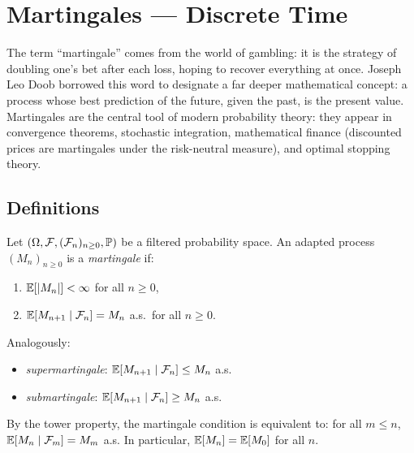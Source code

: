 \chapter{Martingales --- Discrete Time}
\label{ch:discrete_martingales}

The term ``martingale'' comes from the world of gambling: it is the strategy of doubling one's bet after each loss, hoping to recover everything at once. Joseph Leo Doob borrowed this word to designate a far deeper mathematical concept: a process whose best prediction of the future, given the past, is the present value. Martingales are the central tool of modern probability theory: they appear in convergence theorems, stochastic integration, mathematical finance (discounted prices are martingales under the risk-neutral measure), and optimal stopping theory.

\section{Definitions}

\begin{definition}
Let $(\Omega, \mathcal{F}, (\mathcal{F}_n)_{n \geq 0}, \mathbb{P})$ be a filtered
probability space. An adapted process $(M_n)_{n \geq 0}$ is a \emph{martingale}
if:
\begin{enumerate}
  \item $\mathbb{E}[\left| M_n \right|] < \infty$ for all $n \geq 0$,
  \item $\mathbb{E}[M_{n+1} \mid \mathcal{F}_n] = M_n$ a.s.\ for all $n \geq 0$.
\end{enumerate}
Analogously:
\begin{itemize}
  \item \emph{supermartingale}: $\mathbb{E}[M_{n+1} \mid \mathcal{F}_n] \leq M_n$ a.s.
  \item \emph{submartingale}: $\mathbb{E}[M_{n+1} \mid \mathcal{F}_n] \geq M_n$ a.s.
\end{itemize}
\end{definition}

\begin{remark}
By the tower property, the martingale condition is equivalent to: for all
$m \leq n$, $\mathbb{E}[M_n \mid \mathcal{F}_m] = M_m$ a.s. In particular,
$\mathbb{E}[M_n] = \mathbb{E}[M_0]$ for all $n$.
\end{remark}

